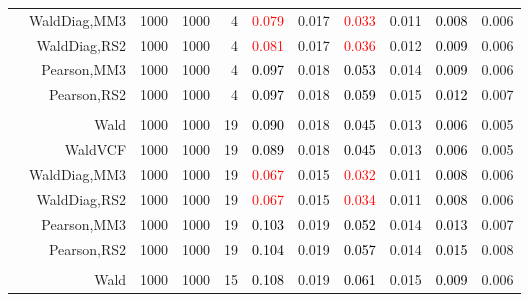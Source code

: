 \documentclass[
]{article}
\begin{document}
\begin{table}[H]
{\begin{tabular}[t]{lrrrrrrrlrr}
\hspace{1em} & WaldDiag,MM3 & 1000 & 1000 & 4 & \textcolor{red}{0.079} & 0.017 & \textcolor{red}{0.033} & 0.011 & \textcolor{black}{0.008} & 0.006\\

\hspace{1em} & WaldDiag,RS2 & 1000 & 1000 & 4 & \textcolor{red}{0.081} & 0.017 & \textcolor{red}{0.036} & 0.012 & \textcolor{black}{0.009} & 0.006\\

\hspace{1em} & Pearson,MM3 & 1000 & 1000 & 4 & \textcolor{black}{0.097} & 0.018 & \textcolor{black}{0.053} & 0.014 & \textcolor{black}{0.009} & 0.006\\

\hspace{1em} & Pearson,RS2 & 1000 & 1000 & 4 & \textcolor{black}{0.097} & 0.018 & \textcolor{black}{0.059} & 0.015 & \textcolor{black}{0.012} & 0.007\\
\cmidrule{1-11}
\addlinespace[0.3em]
\multicolumn{11}{l}{\textbf{1F 15V}}\\
\hspace{1em} & Wald & 1000 & 1000 & 19 & \textcolor{black}{0.090} & 0.018 & \textcolor{black}{0.045} & 0.013 & \textcolor{black}{0.006} & 0.005\\

\hspace{1em} & WaldVCF & 1000 & 1000 & 19 & \textcolor{black}{0.089} & 0.018 & \textcolor{black}{0.045} & 0.013 & \textcolor{black}{0.006} & 0.005\\

\hspace{1em} & WaldDiag,MM3 & 1000 & 1000 & 19 & \textcolor{red}{0.067} & 0.015 & \textcolor{red}{0.032} & 0.011 & \textcolor{black}{0.008} & 0.006\\

\hspace{1em} & WaldDiag,RS2 & 1000 & 1000 & 19 & \textcolor{red}{0.067} & 0.015 & \textcolor{red}{0.034} & 0.011 & \textcolor{black}{0.008} & 0.006\\

\hspace{1em} & Pearson,MM3 & 1000 & 1000 & 19 & \textcolor{black}{0.103} & 0.019 & \textcolor{black}{0.052} & 0.014 & \textcolor{black}{0.013} & 0.007\\

\hspace{1em} & Pearson,RS2 & 1000 & 1000 & 19 & \textcolor{black}{0.104} & 0.019 & \textcolor{black}{0.057} & 0.014 & \textcolor{black}{0.015} & 0.008\\
\cmidrule{1-11}
\addlinespace[0.3em]
\multicolumn{11}{l}{\textbf{2F 10V}}\\
\hspace{1em} & Wald & 1000 & 1000 & 15 & \textcolor{black}{0.108} & 0.019 & \textcolor{black}{0.061} & 0.015 & \textcolor{black}{0.009} & 0.006\\


\end{tabular}}
\end{table}
\end{document}

